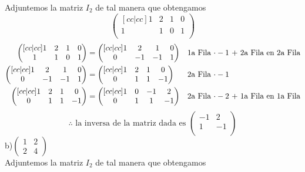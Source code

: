 \documentclass[letterpaper]{article}
\renewcommand{\*}{\cdot}
\theoremstyle{definition}
\begin{document}
	Adjuntemos la matriz $ I_2 $ de tal manera que obtengamos
	\[\begin{pmatrix}[cc|cc]
		1 & 2 & 1 & 0 \\
		1 & 1 & 0 & 1 \\
	\end{pmatrix}\]
	\begin{align*}
		\begin{pmatrix}[cc|cc]
		1 & 2 & 1 & 0 \\
		1 & 1 & 0 & 1 \\
		\end{pmatrix} & = \begin{pmatrix}[cc|cc]
		1 & 2 & 1 & 0 \\
		0 & -1 & -1 & 1 \\
		\end{pmatrix} && \text{1a Fila $ \* -1 $ + 2a Fila en 2a Fila}\\
		\begin{pmatrix}[cc|cc]
		1 & 2 & 1 & 0 \\
		0 & -1 & -1 & 1 \\
		\end{pmatrix} &= \begin{pmatrix}[cc|cc]
		1 & 2 & 1 & 0 \\
		0 & 1 & 1 & -1 \\
		\end{pmatrix} && \text{2a Fila $ \* -1$ }\\
		\begin{pmatrix}[cc|cc]
		1 & 2 & 1 & 0 \\
		0 & 1 & 1 & -1 \\
		\end{pmatrix} & = \begin{pmatrix}[cc|cc]
		1 & 0 & -1 & 2 \\
		0 & 1 & 1 & -1 \\
		\end{pmatrix} && \text{2a Fila $ \* -2 $ + 1a Fila en 1a Fila}
	\end{align*}
	\[ \therefore \text{ la inversa de la matriz dada es }  \begin{pmatrix}
	-1 & 2 \\
	1 & -1 \\
	\end{pmatrix} \]
	b)$\begin{pmatrix} 1 & 2 \\ 2 & 4 \end{pmatrix}$ \\
	Adjuntemos la matriz $ I_2 $ de tal manera que obtengamos
\end{document}
